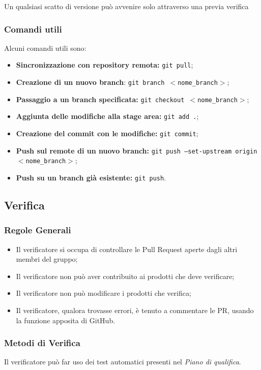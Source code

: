 \documentclass[a4paper, 12pt]{article}
\begin{document}
Un qualsiasi scatto di versione può avvenire solo attraverso una previa verifica

\subsubsection{Comandi utili}
Alcuni comandi utili sono:
\begin{itemize}
\item \textbf{Sincronizzazione con repository remota:} \texttt{git pull};
\item \textbf{Creazione di un nuovo branch}: \texttt{git branch $<$nome\_branch$>$};
\item \textbf{Passaggio a un branch specificata:} \texttt{git checkout $<$nome\_branch$>$};
\item \textbf{Aggiunta delle modifiche alla stage area:} \texttt{git add .};
\item \textbf{Creazione del commit con le modifiche:} \texttt{git commit};
\item \textbf{Push sul remote di un nuovo branch:} \texttt{git push --set-upstream origin $<$nome\_branch$>$};
\item \textbf{Push su un branch già esistente:} \texttt{git push}.
\end{itemize}

\subsection{Verifica}
\subsubsection{Regole Generali}
\begin{itemize}
\item Il verificatore si occupa di controllare le Pull Request aperte dagli altri membri del gruppo;
\item Il verificatore non può aver contribuito ai prodotti che deve verificare;
\item Il verificatore non può modificare i prodotti che verifica;
\item Il verificatore, qualora trovasse errori, è tenuto a commentare le PR, usando la funzione apposita di GitHub.
\end{itemize}
\subsubsection{Metodi di Verifica}
Il verificatore può far uso dei test automatici presenti nel \textit{Piano di qualifica}.
\end{document}
